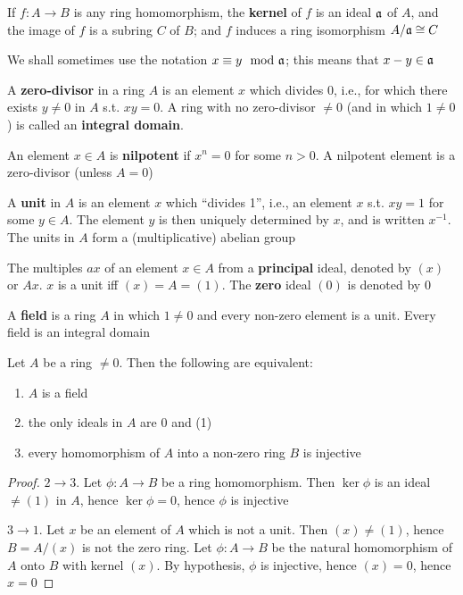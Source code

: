 \documentclass[11pt]{article}
\begin{document}
If \(f:A\to B\) is any ring homomorphism, the \textbf{kernel} of \(f\) is an ideal \(\mathfrak{a}\) of \(A\), and the
image of \(f\) is a subring \(C\) of \(B\); and \(f\) induces a ring isomorphism \(A/\mathfrak{a}\cong C\)

We shall sometimes use the notation \(x\equiv y\mod{\mathfrak{a}}\); this means that \(x-y\in\mathfrak{a}\)

A \textbf{zero-divisor} in a ring \(A\) is an element \(x\) which divides 0, i.e., for which there
exists \(y\neq 0\) in \(A\) s.t. \(xy=0\). A ring with no zero-divisor \(\neq 0\) (and in
which \(1\neq 0\)) is called an \textbf{integral domain}.

An element \(x\in A\) is \textbf{nilpotent} if \(x^n=0\) for some \(n>0\). A nilpotent element is a
zero-divisor (unless \(A=0\))

A \textbf{unit} in \(A\) is an element \(x\) which ``divides 1'', i.e., an element \(x\) s.t. \(xy=1\) for
some \(y\in A\). The element \(y\) is then uniquely determined by \(x\), and is
written \(x^{-1}\). The units in \(A\) form a (multiplicative) abelian group

The multiples \(ax\) of an element \(x\in A\) from a \textbf{principal} ideal, denoted by \((x)\)
or \(Ax\). \(x\) is a unit iff \((x)=A=(1)\). The \textbf{zero} ideal \((0)\) is denoted by 0

A \textbf{field} is a ring \(A\) in which \(1\neq 0\) and every non-zero element is a unit. Every field is
an integral domain

\begin{proposition}[]
Let \(A\) be a ring \(\neq 0\). Then the following are equivalent:
\begin{enumerate}
\item \(A\) is a field
\item the only ideals in \(A\) are 0 and (1)
\item every homomorphism of \(A\) into a non-zero ring \(B\) is injective
\end{enumerate}
\end{proposition}

\begin{proof}
\(2\to 3\). Let \(\phi:A\to B\) be a ring homomorphism. Then \(\ker\phi\) is an ideal \(\neq(1)\) in \(A\),
hence \(\ker\phi=0\), hence \(\phi\) is injective

\(3\to 1\). Let \(x\) be an element of \(A\) which is not a unit. Then \((x)\neq(1)\),
hence \(B=A/(x)\) is not the zero ring. Let \(\phi:A\to B\) be the natural homomorphism of \(A\)
onto \(B\) with kernel \((x)\). By hypothesis, \(\phi\) is injective, hence \((x)=0\), hence \(x=0\)
\end{proof}
\end{document}
